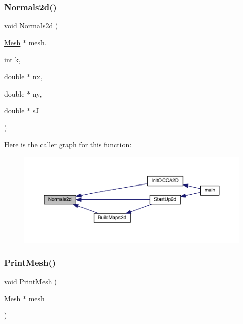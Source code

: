 \mbox{\label{a00581_a6e05f4bc3238ae8e045ddc269dd77f74}} 
\subsubsection{\texorpdfstring{Normals2d()}{Normals2d()}}
{\footnotesize\ttfamily void Normals2d (\begin{DoxyParamCaption}\item[{\hyperlink{a00557_aeffbe0891ab73a4d8964c9cb7978426e}{Mesh} $\ast$}]{mesh,  }\item[{int}]{k,  }\item[{double $\ast$}]{nx,  }\item[{double $\ast$}]{ny,  }\item[{double $\ast$}]{sJ }\end{DoxyParamCaption})}

Here is the caller graph for this function\+:\nopagebreak
\begin{figure}[H]
\begin{center}
\leavevmode
\includegraphics[width=350pt]{a00581_a6e05f4bc3238ae8e045ddc269dd77f74_icgraph}
\end{center}
\end{figure}
\mbox{\label{a00581_ad62a25bbacac8912e4932b3163c885f0}} 
\subsubsection{\texorpdfstring{Print\+Mesh()}{PrintMesh()}}
{\footnotesize\ttfamily void Print\+Mesh (\begin{DoxyParamCaption}\item[{\hyperlink{a00557_aeffbe0891ab73a4d8964c9cb7978426e}{Mesh} $\ast$}]{mesh }\end{DoxyParamCaption})}

